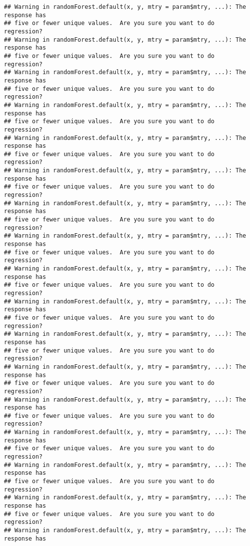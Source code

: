 \documentclass[
]{article}
\begin{document}
\begin{verbatim}
## Warning in randomForest.default(x, y, mtry = param$mtry, ...): The response has
## five or fewer unique values.  Are you sure you want to do regression?
## Warning in randomForest.default(x, y, mtry = param$mtry, ...): The response has
## five or fewer unique values.  Are you sure you want to do regression?
## Warning in randomForest.default(x, y, mtry = param$mtry, ...): The response has
## five or fewer unique values.  Are you sure you want to do regression?
## Warning in randomForest.default(x, y, mtry = param$mtry, ...): The response has
## five or fewer unique values.  Are you sure you want to do regression?
## Warning in randomForest.default(x, y, mtry = param$mtry, ...): The response has
## five or fewer unique values.  Are you sure you want to do regression?
## Warning in randomForest.default(x, y, mtry = param$mtry, ...): The response has
## five or fewer unique values.  Are you sure you want to do regression?
## Warning in randomForest.default(x, y, mtry = param$mtry, ...): The response has
## five or fewer unique values.  Are you sure you want to do regression?
## Warning in randomForest.default(x, y, mtry = param$mtry, ...): The response has
## five or fewer unique values.  Are you sure you want to do regression?
## Warning in randomForest.default(x, y, mtry = param$mtry, ...): The response has
## five or fewer unique values.  Are you sure you want to do regression?
## Warning in randomForest.default(x, y, mtry = param$mtry, ...): The response has
## five or fewer unique values.  Are you sure you want to do regression?
## Warning in randomForest.default(x, y, mtry = param$mtry, ...): The response has
## five or fewer unique values.  Are you sure you want to do regression?
## Warning in randomForest.default(x, y, mtry = param$mtry, ...): The response has
## five or fewer unique values.  Are you sure you want to do regression?
## Warning in randomForest.default(x, y, mtry = param$mtry, ...): The response has
## five or fewer unique values.  Are you sure you want to do regression?
## Warning in randomForest.default(x, y, mtry = param$mtry, ...): The response has
## five or fewer unique values.  Are you sure you want to do regression?
## Warning in randomForest.default(x, y, mtry = param$mtry, ...): The response has
## five or fewer unique values.  Are you sure you want to do regression?
## Warning in randomForest.default(x, y, mtry = param$mtry, ...): The response has
## five or fewer unique values.  Are you sure you want to do regression?
## Warning in randomForest.default(x, y, mtry = param$mtry, ...): The response has

\end{verbatim}
\end{document}
